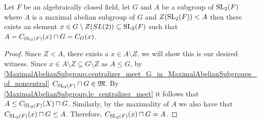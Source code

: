 \begin{lemma}
  \label{MaximalAbelianSubgroup.eq_centralizer_meet_of_center_lt}
  \leanok
  Let $F$ be an algebraically closed field, let $G$ and $A$ be a subgroup of $\operatorname{SL}_2(F)$ where $A$ is a maximal abelian subgroup of $G$ and $Z(\operatorname{SL}_2(F)) < A$ 
  then there exists an element $x \in G \setminus Z(SL(2)) \subseteq \operatorname{SL}_2(F)$ such that
  $A = C_{\operatorname{SL}_2(F)}(x) \sqcap G = C_{G}(x)$.
\end{lemma}
\begin{proof}
  \leanok
  Since $Z < A$, there exists a $x \in A \setminus Z$, we will show this is our desired witness. Since $x \in A \setminus Z \subseteq G \setminus Z$ as $A \le G$, by \ref{MaximalAbelianSubgroup.centralizer_meet_G_in_MaximalAbelianSubgroups_of_noncentral}
  $C_{\operatorname{SL}_2(F)} \sqcap G \in \mathfrak{M}$. By \ref{MaximalAbelianSubgroup.le_centralizer_meet} it follows that $A \le C_{\operatorname{SL}_2(F)}(X) \sqcap G$. Similarly, by the maximality of $A$ we also have
  that $C_{\operatorname{SL}_2(F)}(x) \sqcap G \le A$. Therefore, $C_{\operatorname{SL}_2(F)}(x) \sqcap G = A$.
\end{proof}




